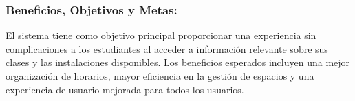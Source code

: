 \subsubsection{Beneficios, Objetivos y Metas:}

El sistema tiene como objetivo principal proporcionar una experiencia sin complicaciones a los estudiantes al acceder a información relevante sobre sus clases y las instalaciones disponibles. Los beneficios esperados incluyen una mejor organización de horarios, mayor eficiencia en la gestión de espacios y una experiencia de usuario mejorada para todos los usuarios.







